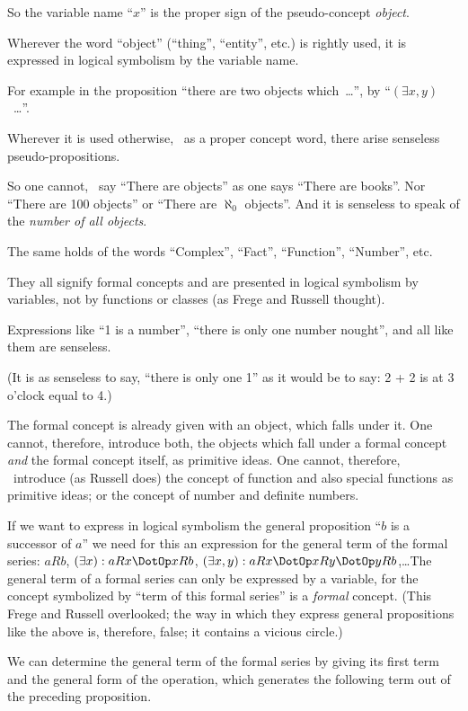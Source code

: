 {So the variable name ``$x$'' is the proper sign of
the pseudo-concept \emph{object}.

Wherever the word ``object'' (``thing'', ``entity'',
etc.) is rightly used, it is expressed in logical
symbolism by the variable name.

For example in the proposition ``there are two
objects which\ \ldots'', by ``$(\exists x,y)$\ \ldots''.

Wherever it is used otherwise, \idEst\ as a proper
concept word, there arise senseless pseudo-propositions.

So one cannot, \exempliGratia\ say ``There are objects''
as one says ``There are books''. Nor ``There
are 100 objects'' or ``There are $\aleph_0$ objects''. And
it is senseless to speak of the \emph{number of all
objects}.

The same holds of the words ``Complex'',
``Fact'', ``Function'', ``Number'', etc.

They all signify formal concepts and are
presented in logical symbolism by variables, not
by functions or classes (as Frege and Russell
thought).

Expressions like ``1 is a number'', ``there is
only one number nought'', and all like them are
senseless.

(It is as senseless to say, ``there is only one 1''
as it would be to say: 2 + 2 is at 3 o'clock equal
to 4.)}


{The formal concept is already given with an
object, which falls under it. One cannot, therefore,
introduce both, the objects which fall under
a formal concept \emph{and} the formal concept itself,
as primitive ideas. One cannot, therefore, \exempliGratia\ introduce
(as Russell does) the concept of function
and also special functions as primitive ideas; or
the concept of number and definite numbers.}


{If we want to express in logical symbolism
the general proposition ``$b$ is a successor of $a$''
we need for this an expression for the general
term of the formal series: $aRb$, $(\exists x) : aRx \DotOp xRb$,
$(\exists x,y) : aRx \DotOp xRy \DotOp yRb$,\;\ldots The general term of
a formal series can only be expressed by a
variable, for the concept symbolized by ``term of
this formal series'' is a \emph{formal} concept. (This
Frege and Russell overlooked; the way in
which they express general propositions like the
above is, therefore, false; it contains a vicious
circle.)

We can determine the general term of the
formal series by giving its first term and the
general form of the operation, which generates
the following term out of the preceding proposition.}


